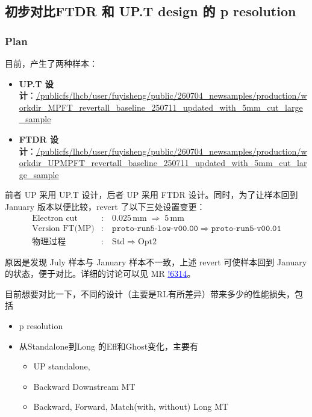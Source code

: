 \documentclass[UTF8]{article}
\newcommand{\link}[2]{\href{#1}{\textcolor{blue}{\underline{#2}}}}
\begin{document}
\subsection{初步对比FTDR 和 UP.T design 的 p resolution}
\subsubsection{Plan}

目前，产生了两种样本：
\begin{itemize}
    \item \textbf{UP.T 设计}：\url{/publicfs/lhcb/user/fuyisheng/public/260704_newsamples/production/workdir_MPFT_revertall_baseline_250711_updated_with_5mm_cut_large_sample}
    \item \textbf{FTDR 设计}：\url{/publicfs/lhcb/user/fuyisheng/public/260704_newsamples/production/workdir_UPMPFT_revertall_baseline_250711_updated_with_5mm_cut_large_sample}
\end{itemize}

前者 UP 采用 UP.T 设计，后者 UP 采用 FTDR 设计。同时，为了让样本回到 January 版本以便比较，revert 了以下三处设置变更：
\begin{eqnarray}
    \text{Electron cut} &:&~ 0.025\,\mathrm{mm} \;\Rightarrow\; 5\,\mathrm{mm} \\
    \text{Version FT(MP)} &:&~ \texttt{proto-run5-low-v00.00} \;\Rightarrow\; \texttt{proto-run5-v00.01} \\
    \text{物理过程} &:&~ \text{Std} \;\Rightarrow\; \text{Opt2}
\end{eqnarray}

原因是发现 July 样本与 January 样本不一致，上述 revert 可使样本回到 January 的状态，便于对比。详细的讨论可以见 MR \link{https://gitlab.cern.ch/lhcb/Moore/-/merge_requests/6314}{!6314}。

目前想要对比一下，不同的设计（主要是RL有所差异）带来多少的性能损失，包括
\begin{itemize}
    \item p resolution
    \item 从Standalone到Long 的Eff和Ghost变化，主要有
    \begin{itemize}
        \item UP standalone, 
        \item Backward Downstream MT
        \item Backward, Forward, Match(with, without) Long MT
    \end{itemize}
\end{itemize}
\end{document}
